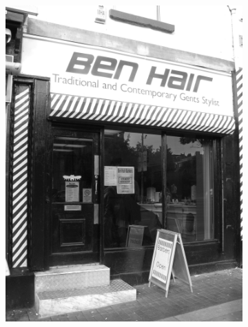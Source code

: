 	\begin{figure}[h]
		\centering
			\begin{subfigure}[h]{0.45\textwidth}
				\centering
				\includegraphics[width=\textwidth]{figures/benhair}
			\end{subfigure}
			\begin{subfigure}[h]{0.45\textwidth}
				\centering

\end{subfigure}
\end{figure}
